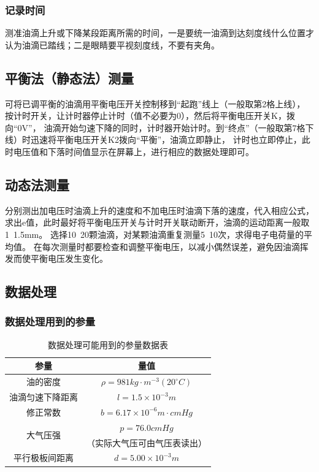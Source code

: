 \documentclass{ctexart}
\begin{document}
    \subsubsection{记录时间}
    测准油滴上升或下降某段距离所需的时间，一是要统一油滴到达刻度线什么位置才认为油滴已踏线；二是眼睛要平视刻度线，不要有夹角。

  \subsection{平衡法（静态法）测量}
  可将已调平衡的油滴用平衡电压开关控制移到“起跑”线上（一般取第2格上线），
  按计时开关，让计时器停止计时（值不必要为0），然后将平衡电压开关K，拨向“0V”，
  油滴开始匀速下降的同时，计时器开始计时。到“终点”（一般取第7格下线）时迅速将平衡电压开关K2拨向“平衡”，油滴立即静止，
  计时也立即停止，此时电压值和下落时间值显示在屏幕上，进行相应的数据处理即可。

  \subsection{动态法测量}
  分别测出加电压时油滴上升的速度和不加电压时油滴下落的速度，代入相应公式，
  求出e值，此时最好将平衡电压开关与计时开关联动断开，油滴的运动距离一般取1~1.5mm。
  选择10~20颗油滴，对某颗油滴重复测量5~10次，求得电子电荷量的平均值。
  在每次测量时都要检查和调整平衡电压，以减小偶然误差，避免因油滴挥发而使平衡电压发生变化。

  \subsection{数据处理}
    \subsubsection{数据处理用到的参量}
    \begin{table}[H]
      \centering
      \begin{tabular}{|c|c|}
        \hline
        \textbf{参量} & \textbf{量值} \\
        \hline
        油的密度 & $\rho = 981 kg \cdot m^{-3} (20 ^{\circ} C)$ \\
        \hline
        油滴匀速下降距离 & $l = 1.5 \times 10^{-3} m $ \\
        \hline
        修正常数 & $b = 6.17 \times 10^{-6} m \cdot cmHg$ \\
        \hline
        \multirow{2}{*}{大气压强} & $p = 76.0 cmHg$ \\
                                & （实际大气压可由气压表读出） \\
        \hline
        平行极板间距离 & $d = 5.00 \times 10^{-3} m$ \\
        \hline
      \end{tabular}
      \caption{数据处理可能用到的参量数据表}
      \label{tab:mytable}
    \end{table}
    
\end{document}
